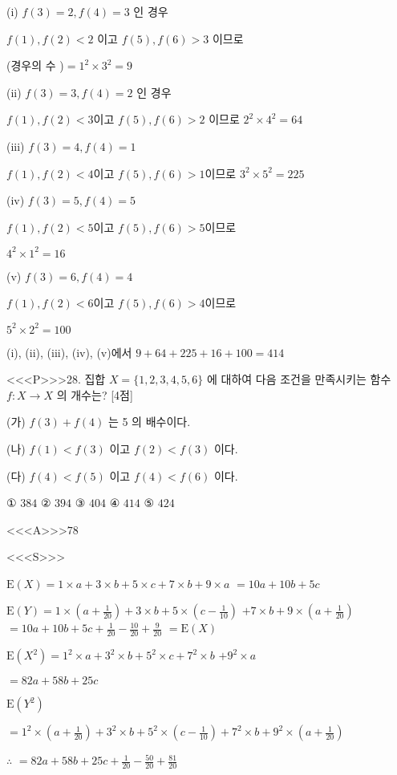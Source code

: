 \documentclass{oblivoir}
\begin{document}
(i) $f(3)=2, f(4)=3$ 인 경우

$f(1), f(2)<2$ 이고 $f(5), f(6)>3$ 이므로

(경우의 수 )$=1^{2} \times 3^{2}=9$

(ii) $f(3)=3, f(4)=2$ 인 경우

$f(1), f(2)<3$이고 $f(5), f(6)>2$ 이므로 $2^{2} \times 4^{2}=64$


(iii) $f(3)=4, f(4)=1$

$f(1), f(2)<4$이고 $f(5), f(6)>1 $이므로 $3^{2} \times 5^{2}=225$

(iv) $f(3)=5, f(4)=5$

$f(1), f(2)<5$이고 $f(5), f(6)>5 $이므로

$4^{2} \times 1^{2}=16$

(v) $f(3)=6, f(4)=4$

$f(1), f(2)<6$이고 $f(5), f(6)>4 $이므로 

$5^{2} \times 2^{2}=100$

(i), (ii), (iii), (iv), (v)에서 $ 9+64+225+16+100=414$

<<<P>>>28. 집합 $X=\{1,2,3,4,5,6\}$ 에 대하여 다음 조건을 만족시키는 함수 $f: X \rightarrow X$ 의 개수는? [4점]

(가) $f(3)+f(4)$ 는 5 의 배수이다.

(나) $f(1)<f(3)$ 이고 $f(2)<f(3)$ 이다.

(다) $f(4)<f(5)$ 이고 $f(4)<f(6)$ 이다.

① $384$
② $394$
③ $404$
④ $414$
⑤ $424$


<<<A>>>$78$

<<<S>>>



$\mathrm{E}(X)=1 \times a+3 \times b+5 \times c+7 \times b+9 \times a$
$=10 a+10 b+5 c$

$\mathrm{E}(Y)=1 \times\left(a+\frac{1}{20}\right)+3 \times b+5 \times\left(c-\frac{1}{10}\right)$
$+7 \times b+9 \times\left(a+\frac{1}{20}\right)$
$=10 a+10 b+5 c+\frac{1}{20}-\frac{10}{20}+\frac{9}{20}$
$=\mathrm{E}(X)$

$\mathrm{E}\left(X^{2}\right)=1^{2} \times a+3^{2} \times b+5^{2} \times c+7^{2} \times b$
$+9^{2} \times a$

$=82 a+58 b+25 c$

$ \mathrm{E}\left(Y^{2}\right)$

$=1^{2} \times\left(a+\frac{1}{20}\right)+3^{2} \times b+5^{2} \times\left(c-\frac{1}{10}\right) +7^{2} \times b+9^{2} \times\left(a+\frac{1}{20}\right)$

$\therefore$ $=82 a+58 b+25 c+\frac{1}{20}-\frac{50}{20}+\frac{81}{20}$
\end{document}

